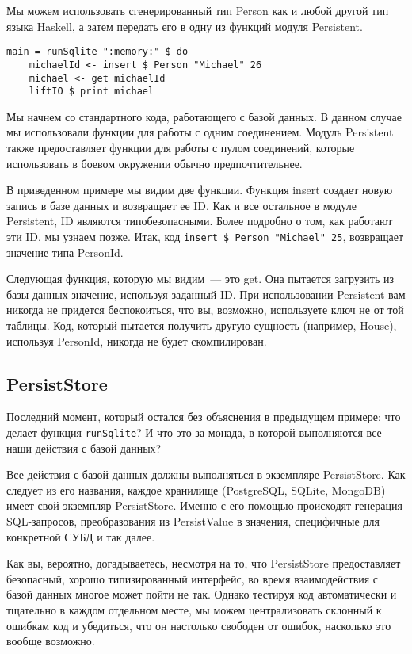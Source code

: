 Мы можем использовать сгенерированный тип Person как и любой другой тип языка Haskell, а затем передать его в одну из функций модуля Persistent.

\begin{lstlisting}
main = runSqlite ":memory:" $ do
    michaelId <- insert $ Person "Michael" 26
    michael <- get michaelId
    liftIO $ print michael
\end{lstlisting}%

Мы начнем со стандартного кода, работающего с базой данных. В данном случае мы использовали функции для работы с одним соединением. Модуль Persistent также предоставляет функции для работы с пулом соединений, которые использовать в боевом окружении обычно предпочтительнее.

В приведенном примере мы видим две функции. Функция insert создает новую запись в базе данных и возвращает ее ID. Как и все остальное в модуле Persistent, ID являются типобезопасными. Более подробно о том, как работают эти ID, мы узнаем позже. Итак, код \lstinline'insert $ Person "Michael" 25', возвращает значение типа PersonId.

Следующая функция, которую мы видим~--- это get. Она пытается загрузить из базы данных значение, используя заданный ID. При использовании Persistent вам никогда не придется беспокоиться, что вы, возможно, используете ключ не от той таблицы. Код, который пытается получить другую сущность (например, House), используя PersonId, никогда не будет скомпилирован.

\subsection{PersistStore}

Последний момент, который остался без объяснения в предыдущем примере: что делает функция \lstinline'runSqlite'? И что это за монада, в которой выполняются все наши действия с базой данных?

Все действия с базой данных должны выполняться в экземпляре PersistStore. Как следует из его названия, каждое хранилище (PostgreSQL, SQLite, MongoDB) имеет свой экземпляр PersistStore. Именно с его помощью происходят генерация SQL-запросов, преобразования из PersistValue в значения, специфичные для конкретной СУБД и так далее.

\begin{remark}
Как вы, вероятно, догадываетесь, несмотря на то, что PersistStore предоставляет безопасный, хорошо типизированный интерфейс, во время взаимодействия с базой данных многое может пойти не так. Однако тестируя код автоматически и тщательно в каждом отдельном месте, мы можем централизовать склонный к ошибкам код и убедиться, что он настолько свободен от ошибок, насколько это вообще возможно.
\end{remark}

